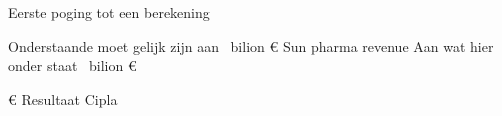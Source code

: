 Eerste poging tot een berekening




\resetgrandtotals



Onderstaande moet gelijk zijn aan
 \pgfmathresult~bilion \euro%
Sun pharma revenue
Aan wat hier onder staat
 \pgfmathresult~bilion \euro%

 \pgfmathresult \euro %
Resultaat Cipla



